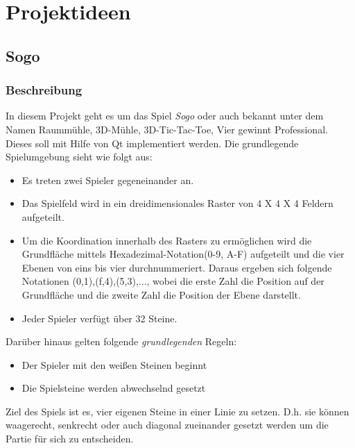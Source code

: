 \documentclass[a4paper]{scrartcl}
\begin{document}
\newpage

%
%

\thispagestyle{empty}


\newpage

%
%

\setcounter{page}{3}
\section{Projektideen}

\subsection{Sogo}
\subsubsection*{Beschreibung}

In diesem Projekt geht es um das Spiel \textit{Sogo} oder auch bekannt unter dem Namen Raummühle, 3D-Mühle, 3D-Tic-Tac-Toe, Vier gewinnt Professional. Dieses soll mit Hilfe von Qt implementiert werden. Die grundlegende Spielumgebung sieht wie folgt aus:
\begin{itemize}
	\item Es treten zwei Spieler gegeneinander an.
	\item Das Spielfeld wird in ein dreidimensionales Raster von 4 X 4 X 4 Feldern aufgeteilt.
	\item Um die Koordination innerhalb des Rasters zu ermöglichen wird die Grundfläche mittels Hexadezimal-Notation(0-9, A-F) aufgeteilt und die vier Ebenen von eins bis vier durchnummeriert. Daraus ergeben sich folgende Notationen {(0,1),(f,4),(5,3),...}, wobei die erste Zahl die Position auf der Grundfläche und die zweite Zahl die Position der Ebene darstellt.
	\item Jeder Spieler verfügt über 32 Steine.
\end{itemize}
Darüber hinaus gelten folgende \textit{grundlegenden} Regeln:
\begin{itemize}
	\item Der Spieler mit den weißen Steinen beginnt
	\item Die Spielsteine werden abwechselnd gesetzt
\end{itemize}
Ziel des Spiels ist es, vier eigenen Steine in einer Linie zu setzen. D.h. sie können waagerecht, senkrecht oder auch diagonal zueinander gesetzt werden um die Partie für sich zu entscheiden.
\end{document}
